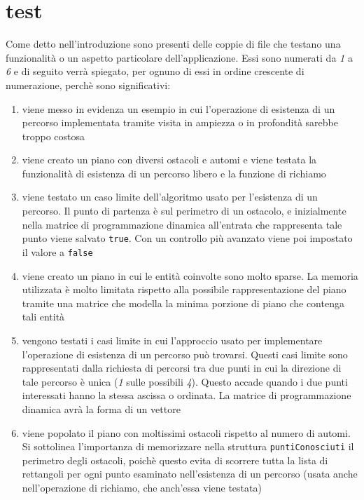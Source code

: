 \documentclass[a4paper,11pt]{article}
\begin{document}
\section{test}

Come detto nell'introduzione sono presenti delle coppie di file che testano una funzionalità o un aspetto particolare dell'applicazione. Essi sono numerati da \textit{1} a \textit{6} e di seguito verrà spiegato, per ognuno di essi in ordine crescente di numerazione, perchè sono significativi:


\begin{enumerate}
    \item viene messo in evidenza un esempio in cui l'operazione di esistenza di un percorso implementata tramite visita in ampiezza o in profondità sarebbe troppo costosa


    \item viene creato un piano con diversi ostacoli e automi e viene testata la funzionalità di esistenza di un percorso libero e la funzione di richiamo


    \item viene testato un caso limite dell'algoritmo usato per l'esistenza di un percorso. Il punto di partenza è sul perimetro di un ostacolo, e inizialmente nella matrice di programmazione dinamica all'entrata che rappresenta tale punto viene salvato \texttt{true}. Con un controllo più avanzato viene poi impostato il valore a \texttt{false}


    \item viene creato un piano in cui le entità coinvolte sono molto sparse. La memoria utilizzata è molto limitata rispetto alla possibile rappresentazione del piano tramite una matrice che modella la minima porzione di piano che contenga tali entità

    \item vengono testati i casi limite in cui l'approccio usato per implementare l'operazione di esistenza di un percorso può trovarsi. Questi casi limite sono rappresentati dalla richiesta di percorsi tra due punti in cui la direzione di tale percorso è unica (\textit{1} sulle possibili \textit{4}). Questo accade quando i due punti interessati hanno la stessa ascissa o ordinata. La matrice di programmazione dinamica avrà la forma di un vettore

    \item viene popolato il piano con moltissimi ostacoli rispetto al numero di automi. Si sottolinea l'importanza di memorizzare nella struttura \texttt{puntiConosciuti} il perimetro degli ostacoli, poichè questo evita di scorrere tutta la lista di rettangoli per ogni punto esaminato nell'esistenza di un percorso (usata anche nell'operazione di richiamo, che anch'essa viene testata)
\end{enumerate}
\end{document}
